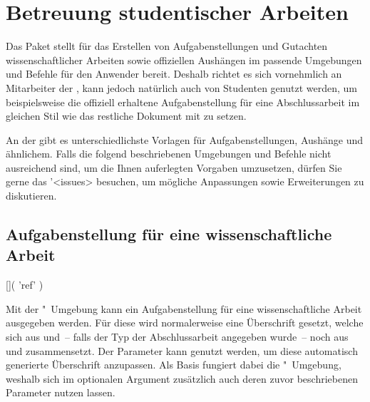 \chapter[%
  Das Paket \PackageRaw{tudscrsupervisor}{\BooleanFalse}
  -- Studentische Betreuung%
]{%
  Betreuung studentischer Arbeiten%
}
\begin{Entity*}{}
%
Das Paket  stellt für das Erstellen von 
Aufgabenstellungen und Gutachten wissenschaftlicher Arbeiten sowie offiziellen 
Aushängen im \CD passende Umgebungen und Befehle für den Anwender bereit. 
Deshalb richtet es sich vornehmlich an Mitarbeiter der \TnUD, kann jedoch 
natürlich auch von Studenten genutzt werden, um beispielsweise die offiziell 
erhaltene Aufgabenstellung für eine Abschlussarbeit im gleichen Stil wie das 
restliche Dokument mit  zu setzen.

An der \TUD gibt es unterschiedlichste Vorlagen für Aufgabenstellungen, 
Aushänge und ähnlichem. Falls die folgend beschriebenen Umgebungen und Befehle 
nicht ausreichend sind, um die Ihnen auferlegten Vorgaben umzusetzen, dürfen 
Sie gerne das \GitHubRepo'<issues> besuchen, um mögliche Anpassungen sowie 
Erweiterungen zu diskutieren.



\section{%
  Aufgabenstellung für eine wissenschaftliche Arbeit%
}
\begin{Declaration}{[]}(%
  'ref'%
)
\begin{Declaration}{}
\begin{Declaration}[v2.05]{}
\printdeclarationlist%
%
Mit der "~Umgebung kann ein Aufgabenstellung für eine 
wissenschaftliche Arbeit ausgegeben werden. Für diese wird normalerweise eine 
Überschrift gesetzt, welche sich aus  und~-- falls der Typ der 
Abschlussarbeit angegeben wurde~-- noch aus  und  
zusammensetzt. Der Parameter  kann genutzt 
werden, um diese automatisch generierte Überschrift anzupassen. Als Basis 
fungiert dabei die "~Umgebung, weshalb sich im optionalen 
Argument zusätzlich auch deren zuvor beschriebenen Parameter nutzen lassen.


\end{Declaration}
\end{Declaration}
\end{Declaration}
\end{Entity*}
